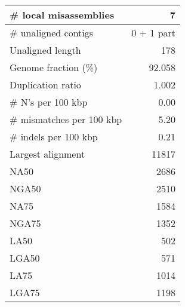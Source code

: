 \documentclass[12pt,a4paper]{article}
\begin{document}
\begin{table}[ht]
\begin{center}
\begin{tabular}{|l*{1}{|r}|}
\# local misassemblies & 7 \\ \hline
\# unaligned contigs & 0 + 1 part \\ \hline
Unaligned length & 178 \\ \hline
Genome fraction (\%) & 92.058 \\ \hline
Duplication ratio & 1.002 \\ \hline
\# N's per 100 kbp & 0.00 \\ \hline
\# mismatches per 100 kbp & 5.20 \\ \hline
\# indels per 100 kbp & 0.21 \\ \hline
Largest alignment & 11817 \\ \hline
NA50 & 2686 \\ \hline
NGA50 & 2510 \\ \hline
NA75 & 1584 \\ \hline
NGA75 & 1352 \\ \hline
LA50 & 502 \\ \hline
LGA50 & 571 \\ \hline
LA75 & 1014 \\ \hline
LGA75 & 1198 \\ \hline
\end{tabular}
\end{center}
\end{table}
\end{document}
